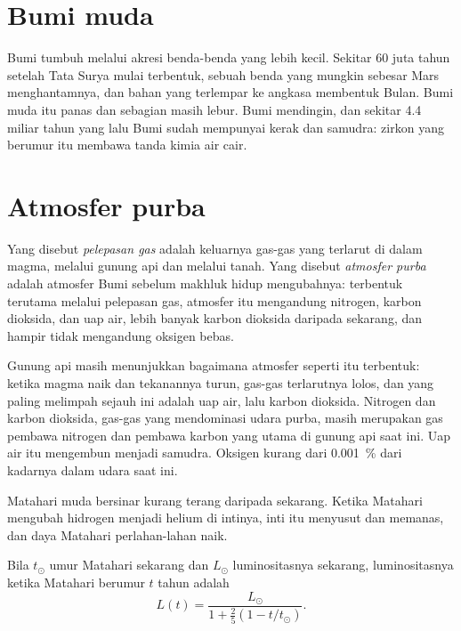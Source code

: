 \section{Bumi muda}

Bumi tumbuh melalui akresi benda-benda yang lebih kecil. Sekitar 60 juta tahun
setelah Tata Surya mulai terbentuk, sebuah benda yang mungkin sebesar Mars
menghantamnya, dan bahan yang terlempar ke angkasa membentuk Bulan. Bumi muda
itu panas dan sebagian masih lebur. Bumi mendingin, dan sekitar 4.4 miliar tahun
yang lalu Bumi sudah mempunyai kerak dan samudra: zirkon yang berumur itu
membawa tanda kimia air cair.

\section{Atmosfer purba}

\begin{definition}\label{def:g12:early-earth:primitive-atmosphere}
Yang disebut \emph{pelepasan gas} adalah keluarnya gas-gas
yang terlarut di dalam magma, melalui gunung api dan melalui tanah. Yang disebut
\emph{atmosfer purba} adalah atmosfer Bumi sebelum
makhluk hidup mengubahnya: terbentuk terutama melalui pelepasan gas, atmosfer
itu mengandung nitrogen, karbon dioksida, dan uap air, lebih banyak karbon
dioksida daripada sekarang, dan hampir tidak mengandung oksigen bebas.
\end{definition}

Gunung api masih menunjukkan bagaimana atmosfer seperti itu terbentuk: ketika
magma naik dan tekanannya turun, gas-gas terlarutnya lolos, dan yang paling
melimpah sejauh ini adalah uap air, lalu karbon dioksida. Nitrogen dan karbon
dioksida, gas-gas yang mendominasi udara purba, masih merupakan gas pembawa
nitrogen dan pembawa karbon yang utama di gunung api saat ini. Uap air itu
mengembun menjadi samudra. Oksigen kurang dari \qty{0.001}{\percent} dari
kadarnya dalam udara saat ini.

Matahari muda bersinar kurang terang daripada sekarang. Ketika Matahari
mengubah hidrogen menjadi helium di intinya, inti itu menyusut dan memanas, dan
daya Matahari perlahan-lahan naik.

\begin{proposition}\label{prop:g12:early-earth:luminosity}
Bila $t_\odot$ umur Matahari sekarang dan $L_\odot$ luminositasnya sekarang,
luminositasnya ketika Matahari berumur $t$ tahun adalah
\[
  L(t) = \frac{L_\odot}{1 + \frac{2}{5}\left(1 - t/t_\odot\right)} .
\]
\end{proposition}

